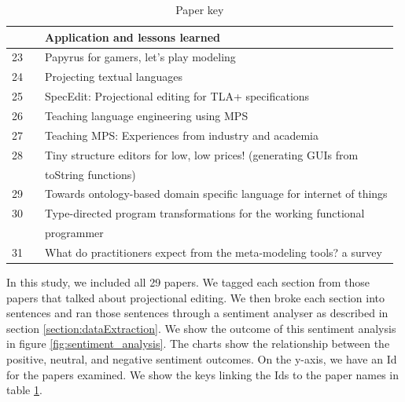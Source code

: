 \begin{table}
\begin{center}
\begin{tabular}{ |c  c|l | }
                &                                        & Application and lessons learned                                             \\ \hline
            23  & \cite{bucchiarone2020papyrus_SLR}      & Papyrus for gamers, let’s play modeling                                     \\ \hline
            24  & \cite{merino2021projecting_SLR}        & Projecting textual languages                                                \\ \hline
            25  & \cite{cuinat2020specedit_SLR}          & SpecEdit: Projectional editing for TLA+ specifications                      \\ \hline
            26  & \cite{prinz2021teaching_SLR}           & Teaching language engineering using MPS                                     \\ \hline
            27  & \cite{barash2021teaching_SLR}          & Teaching MPS: Experiences from industry and academia                        \\ \hline
            28  & \cite{hempel2020tiny_SLR}              & Tiny structure editors for low, low prices! (generating GUIs from           \\
                &                                        & toString functions)                                                         \\ \hline
            29  & \cite{negm2020towards_SLR}             & Towards ontology-based domain specific language for internet of things      \\ \hline
            30  & \cite{lubin2020type_SLR}               & Type-directed program transformations for the working functional            \\
                &                                        & programmer                                                                  \\ \hline
            31  & \cite{ozkaya2021practitioners_SLR}     & What do practitioners expect from the meta-modeling tools? a survey         \\ \hline
        \end{tabular}
    \end{center}
    \caption{Paper key}
    \label{table:paper_key}
\end{table}

In this study, we included all 29 papers.
We tagged each section from those papers that talked about projectional editing.
We then broke each section into sentences and ran those sentences through a sentiment analyser as described in section \ref{section:dataExtraction}.
We show the outcome of this sentiment analysis in figure \ref{fig:sentiment_analysis}. 
The charts show the relationship between the positive, neutral, and negative sentiment outcomes.
On the y-axis, we have an Id for the papers examined. 
We show the keys linking the Ids to the paper names in table \ref{table:paper_key}.

